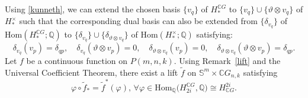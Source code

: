 \documentclass{amsart}
\newcommand{\remref}[1]{Remark~\ref{#1}}
\renewcommand{\hom}{\mathrm{Hom}}
\begin{document}
	
	Using \eqref{kunneth}, we can extend the chosen basis $\{v_q\}$ of $H_*^{\mathbb{C}G}$ to $	\{v_q\} \cup \{\vartheta \otimes v_q\}$ of $H_*^\times$ such that the corresponding dual basis can also be extended from $\{\delta_{v_q}\}$ of $ \hom (H_*^{\mathbb{C}G};\mathbb{Q})$ to $\{\delta_{v_q}\} \cup \{\delta_{\vartheta \otimes v_q}\} $ of $\hom (H_*^{\times};\mathbb{Q})$ satisfying:
	\begin{equation}\label{Kronecker relations}
		\delta_{v_q}( v_p) = \delta_{qp}, \quad
		\delta_{v_q}( \vartheta \otimes v_p)= 0, \quad
		\delta_{\vartheta\otimes v_q}(v_p) = 0, \quad
		\delta_{\vartheta\otimes v_q}(\vartheta \otimes v_p)= \delta_{qp}.
	\end{equation}
	Let $f$ be a continuous function on $P(m,n,k)$. Using \remref{lift} and the Universal Coefficient Theorem, there exist a lift $\tilde{f}$ on $\mathbb{S}^m\times \mathbb{C}G_{n,k}$ satisfying \begin{equation}\label{comm with phi}
		\varphi \circ \tilde{f}_* = \tilde{f}^*(\varphi) , \, \forall
		\varphi \in \hom _{\mathbb Q}\big(H_{2i}^{\mathbb CG}, \mathbb Q\big)\cong H^{2i}_{\mathbb CG}.
	\end{equation}
	
\end{document}
